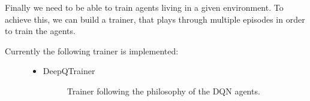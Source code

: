 \documentclass[letterpaper,10pt,english]{sphinxmanual}
\begin{document}
\sphinxAtStartPar
{}
Finally we need to be able to train agents living in a given environment. To achieve this, we can build a trainer, that
plays through multiple episodes in order to train the agents.
\begin{description}
\item[{Currently the following trainer is implemented:}] \leavevmode\begin{itemize}
\item {} \begin{description}
\item[{DeepQTrainer}] \leavevmode
\sphinxAtStartPar
Trainer following the philosophy of the DQN agents.

\end{description}

\end{itemize}

\end{description}
\end{document}
